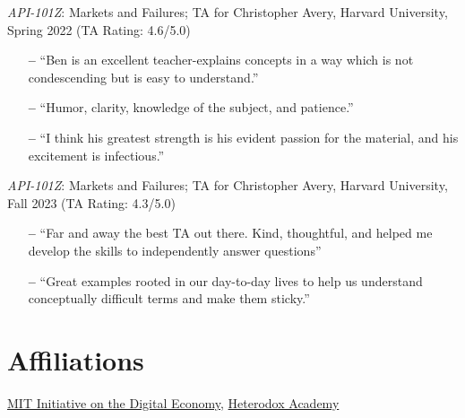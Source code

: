 \documentclass[margin,line,pifont,palatino,courier, 9pt]{res}
\begin{document}
\begin{resume}
\textit{API-101Z}: Markets and Failures; TA for Christopher Avery, Harvard University, Spring 2022 (TA Rating: 4.6/5.0)
\begin{itemize}
    \item[\textbf{--}] ``Ben is an excellent teacher-explains concepts in a way which is not condescending but is easy to understand.''
    \item[\textbf{--}] ``Humor, clarity, knowledge of the subject, and patience.''
    \item[\textbf{--}] ``I think his greatest strength is his evident passion for the material, and his excitement is infectious.''
\end{itemize}

\textit{API-101Z}: Markets and Failures; TA for Christopher Avery, Harvard University, Fall 2023 (TA Rating: 4.3/5.0)
\begin{itemize}
    \item[\textbf{--}] ``Far and away the best TA out there. Kind, thoughtful, and helped me develop the skills to independently answer questions''
    \item[\textbf{--}] ``Great examples rooted in our day-to-day lives to help us understand conceptually difficult terms and make them sticky.''
\end{itemize}




\section{\sc Affiliations}
\href{https://ide.mit.edu/}{MIT Initiative on the Digital Economy}, \href{https://heterodoxacademy.org/}{Heterodox Academy}


\end{resume}
\end{document}
